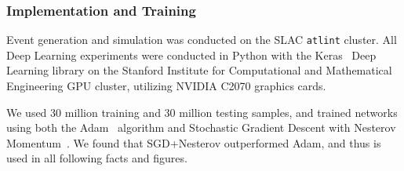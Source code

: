 
\subsubsection{Implementation and Training} %
\label{ssub:implementation_and_training}

Event generation and simulation was conducted on the SLAC \texttt{atlint} cluster. All Deep Learning experiments were conducted in Python with the Keras~\cite{Keras} Deep Learning library on the Stanford Institute for Computational and Mathematical Engineering GPU cluster, utilizing NVIDIA C2070 graphics cards. 

We used 30 million training and 30 million testing samples, and trained networks using both the Adam~\cite{DBLP:journals/corr/KingmaB14} algorithm and Stochastic Gradient Descent with Nesterov Momentum~\cite{Nesterov:1983wy}. We found that SGD+Nesterov outperformed Adam, and thus is used in all following facts and figures.


